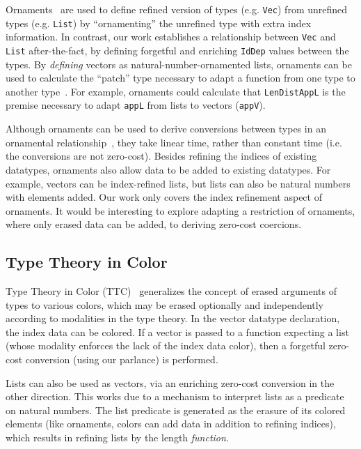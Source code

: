 \documentclass[acmsmall]{acmart}\settopmatter{}
\begin{document}
Ornaments~\cite{ornaments:original} are used to define refined
version of types (e.g. \texttt{Vec}) from unrefined types
(e.g. \texttt{List}) by ``ornamenting'' the unrefined type with extra
index information. In contrast, our work establishes a relationship
between \texttt{Vec} and \texttt{List} after-the-fact, by defining
forgetful and enriching \verb;IdDep; values between the types.
By \textit{defining} vectors as natural-number-ornamented lists,
ornaments can be used to calculate the ``patch'' type necessary to adapt a
function from one type to another type~\cite{ornaments:functional}.
For example, ornaments could
calculate that \texttt{LenDistAppL} is the premise necessary to adapt
\texttt{appL} from lists to vectors (\texttt{appV}).

Although ornaments can be used to derive conversions between
types in an ornamental
relationship~\cite{ornaments:original,ornaments:relational},
they take linear time, rather than constant time (i.e. the conversions
are not zero-cost).
Besides refining the indices of existing datatypes, ornaments
also allow data to be added to existing datatypes. For example, vectors can
be index-refined lists, but lists can also be natural numbers with
elements added. Our work only covers the index refinement aspect of
ornaments. It would be interesting to explore adapting a
restriction of ornaments, where only erased data can be added,
to deriving zero-cost coercions.

\subsection{Type Theory in Color}

Type Theory in Color (TTC)~\cite{bernardy:color}
generalizes the concept of erased arguments
of types to various colors, which may be erased optionally and
independently according to modalities in the type theory. In the vector
datatype declaration, the index data can be colored. If a vector is
passed to a function expecting a list (whose modality enforces the
lack of the index data color), then a forgetful zero-cost conversion
(using our parlance) is performed.

Lists can also be used as vectors, via an enriching zero-cost
conversion in the other direction. This works due to a mechanism to
interpret lists as a predicate on natural numbers. The list predicate is
generated as the erasure of its colored elements (like ornaments,
colors can add data in addition to refining indices), which results in
refining lists by the length \textit{function}.
\end{document}
